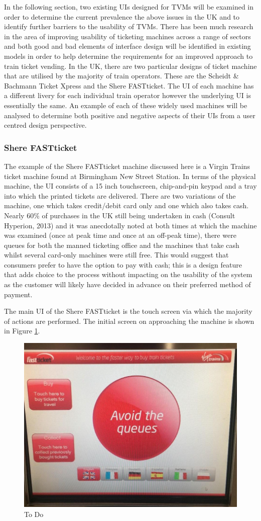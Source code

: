 In the following section, two existing UIs designed for TVMs will be examined in order to determine the current prevalence the above issues in the UK and to identify further barriers to the usability of TVMs. There has been much research in the area of improving usability of ticketing machines across a range of sectors and both good and bad elements of interface design will be identified in existing models in order to help determine the requirements for an improved approach to train ticket vending.
In the UK, there are two particular designs of ticket machine that are utilised by the majority of train operators. These are the Scheidt \& Bachmann Ticket Xpress and the Shere FASTticket. The UI of each machine has a different livery for each individual train operator however the underlying UI is essentially the same. An example of each of these widely used machines will be analysed to determine both positive and negative aspects of their UIs from a user centred design perspective.

\subsubsection{Shere FASTticket}
The example of the Shere FASTticket machine discussed here is a Virgin Trains ticket machine found at Birmingham New Street Station. In terms of the physical machine, the UI consists of a 15 inch touchscreen, chip-and-pin keypad and a tray into which the printed tickets are delivered. There are two variations of the machine, one which takes credit/debit card only and one which also takes cash. Nearly 60\% of purchases in the UK still being undertaken in cash (Consult Hyperion, 2013) and it was anecdotally noted at both times at which the machine was examined (once at peak time and once at an off-peak time), there were queues for both the manned ticketing office and the machines that take cash whilst several card-only machines were still free. This would suggest that consumers prefer to have the option to pay with cash; this is a design feature that adds choice to the process without impacting on the usability of the system as the customer will likely have decided in advance on their preferred method of payment. 

The main UI of the Shere FASTticket is the touch screen via which the majority of actions are performed. The initial screen on approaching the machine is shown in Figure \ref{fig:avoidQueues}. 

\begin{figure}[h]
	\centering
	\includegraphics[width=0.5\linewidth, angle=0, origin=c]{images/image02}
	\caption{To Do}
	\label{fig:avoidQueues}
\end{figure}


